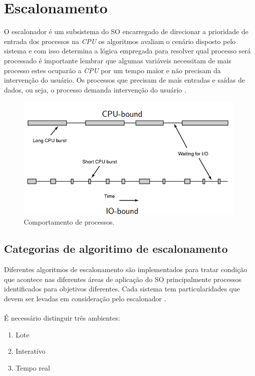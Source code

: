 \newpage
\section{Escalonamento}\label{sec:Escalonamento}

O escalonador é um subsistema do SO encarregado de direcionar a prioridade de entrada dos processos na \emph{CPU} os algoritmos avaliam o cenário disposto pelo sistema e com isso determina a lógica empregada para resolver qual processo será processado é importante lembrar que algumas variáveis necessitam de mais processo estes ocuparão a \emph{CPU} por um tempo maior e não precisam da intervenção do usuário. Os processos que precisam de mais entradas e saídas de dados, ou seja, o processo demanda intervenção do usuário \cite{Tanenbaum2016}.
\begin{figure}[htpb]
    \centering
   \includegraphics[scale=.4]{imagens/escalonamento1.png}
   \caption{Comportamento de processos. \cite{Tanenbaum2016}}
   \label{fig:escalonador}
\end{figure}

\subsection{Categorias de algoritimo de escalonamento}

Diferentes algoritmos de escalonamento são implementados para tratar condição que acontece nas diferentes áreas de aplicação do SO principalmente processos identificados para objetivos diferentes. Cada sistema tem particularidades que devem ser levadas em consideração pelo escalonador \cite{Tanenbaum2016}.\\
\\É necessário distinguir três ambientes:
    \begin{enumerate}
        \item Lote
        \item Interativo
        \item Tempo real 
    \end{enumerate}


